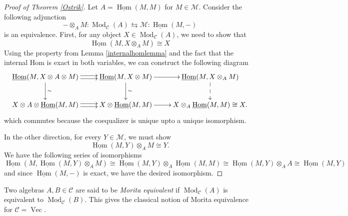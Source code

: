 \documentclass[11pt]{book}
\theoremstyle{Rem}
\theoremstyle{definition}
\numberwithin{equation}{section}
\newcommand\Vect{\operatorname{Vec}}
\newcommand\Hom{\operatorname{Hom}}
\newcommand\Mod{\operatorname{Mod}}
\newcommand\M{\mathcal{M}}
\newcommand\C{\mathcal C}
\begin{document}
\begin{proof} [Proof of Theorem \ref{Ostrik}]
Let $A=\underline{\Hom} (M,M)$ for $M\in \M$. Consider the following adjunction \begin{equation}
	- \otimes_A M : \Mod_\C(A) \leftrightarrows  \M : \underline{\Hom}( M, -) 
\end{equation}is an equivalence. First, for any object $X\in \Mod_\C(A)$, we need to show that \begin{equation}
	\underline{\Hom}(M, X\otimes_A M) \cong X
\end{equation}
Using the property from Lemma \ref{internalhomlemma} and the fact that the internal Hom is exact in both variables, we can construct the following diagram \begin{equation}\label{coequalizercommute}
	\xymatrix{\underline{\Hom}(M, X\otimes A \otimes M) \ar@<-.5ex>[r] \ar@<.5ex>[r]\ar[d]^{\sim} & \underline{\Hom}(M, X\otimes M) \ar[r]\ar[d]^{\sim} & \underline{\Hom}(M, X\otimes_A M)\ar@{-->}[d] \\
	X\otimes A \otimes \underline{\Hom}(M, M) \ar@<-.5ex>[r] \ar@<.5ex>[r] & X\otimes \underline{\Hom}(M,  M) \ar[r] & X\otimes_A \underline{\Hom}(M,  M)\cong X.}
\end{equation} which commutes because the coequalizer is unique upto a unique isomorphism.

In the other direction, for every $Y \in \M$, we must show\begin{equation}
	 \underline{\Hom} (M,Y) \otimes_A M \cong Y.
\end{equation}
We have the following series of isomorphisms \begin{equation}
	\underline{\Hom}(M, \underline{\Hom} (M,Y) \otimes_A M) \cong \underline{\Hom} (M,Y)  \otimes_A \underline{\Hom}(M, M) \cong  \underline{\Hom} (M,Y)  \otimes_A A \cong \underline{\Hom} (M,Y)
\end{equation}
and since $\underline{\Hom}(M, -)$ is exact, we have the desired isomorphism.
\end{proof}

Two algebras $A, B \in \C$ are said to be \textit{Morita equivalent} if $\Mod_\C(A)$ is equivalent to $\Mod_\C(B)$. This gives the classical notion of Morita equivalence for $\C = \Vect$. 
\end{document}

